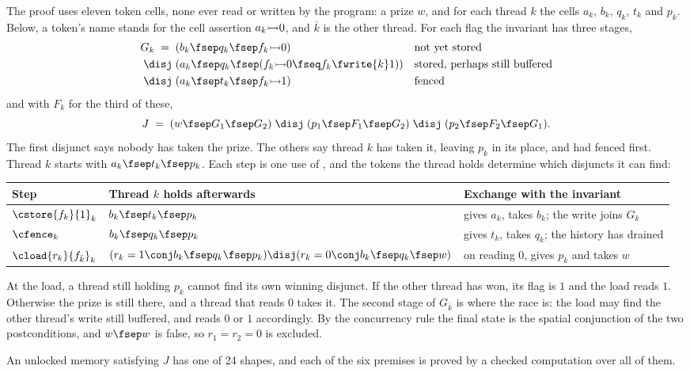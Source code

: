 The proof uses eleven token cells, none ever read or written by the
program: a prize $w$, and for each thread $k$ the cells $a_k$, $b_k$,
$q_k$, $t_k$ and $p_k$. Below, a token's name stands for the cell
assertion $a_k \operatorname{\!\rightarrowtail\!} 0$, and $\bar{k}$ is the other thread. For each flag
the invariant has three stages,
\begin{align*}
 G_k \;=\;\; & (b_k \fsep q_k \fsep f_k \fcell 0)
     && \text{not yet stored} \\
 \disj\; & (a_k \fsep q_k \fsep (f_k \fcell 0 \fseq f_k \fwrite{k} 1))
     && \text{stored, perhaps still buffered} \\
 \disj\; & (a_k \fsep t_k \fsep f_k \fcell 1)
     && \text{fenced}
\end{align*}
and with $F_k$ for the third of these,
\[
  J \;=\; (w \fsep G_1 \fsep G_2) \;\disj\; (p_1 \fsep F_1 \fsep G_2)
     \;\disj\; (p_2 \fsep F_2 \fsep G_1).
\]
The first disjunct says nobody has taken the prize. The others say thread
$k$ has taken it, leaving $p_k$ in its place, and had fenced first. Thread
$k$ starts with $a_k \fsep t_k \fsep p_k$. Each step is one use of
, and the tokens the thread holds determine which disjuncts it
can find:
\begin{center}
\small
\begin{tabular}{@{}lll@{}}
\toprule
Step & Thread $k$ holds afterwards & Exchange with the invariant \\
\midrule
$\cstore{f_k}{1}_k$ & $b_k \fsep t_k \fsep p_k$ &
  gives $a_k$, takes $b_k$; the write joins $G_k$ \\
$\cfence_k$ & $b_k \fsep q_k \fsep p_k$ &
  gives $t_k$, takes $q_k$; the history has drained \\
$\cload{r_k}{f_{\bar{k}}}_k$ &
  $(r_k = 1 \conj b_k \fsep q_k \fsep p_k) \disj
   (r_k = 0 \conj b_k \fsep q_k \fsep w)$ &
  on reading $0$, gives $p_k$ and takes $w$ \\
\bottomrule
\end{tabular}
\end{center}
At the load, a thread still holding $p_k$ cannot find its own winning
disjunct. If the other thread has won, its flag is $1$ and the load reads
$1$. Otherwise the prize is still there, and a thread that reads $0$ takes
it. The second stage of $G_{\bar{k}}$ is where the race is: the load may
find the other thread's write still buffered, and reads $0$ or $1$
accordingly. By the concurrency rule the final state is the spatial
conjunction of the two postconditions, and $w \fsep w$ is false, so
$r_1 = r_2 = 0$ is excluded.

An unlocked memory satisfying $J$ has one of 24 shapes, and each of the six
premises is proved by a checked computation over all of them.
